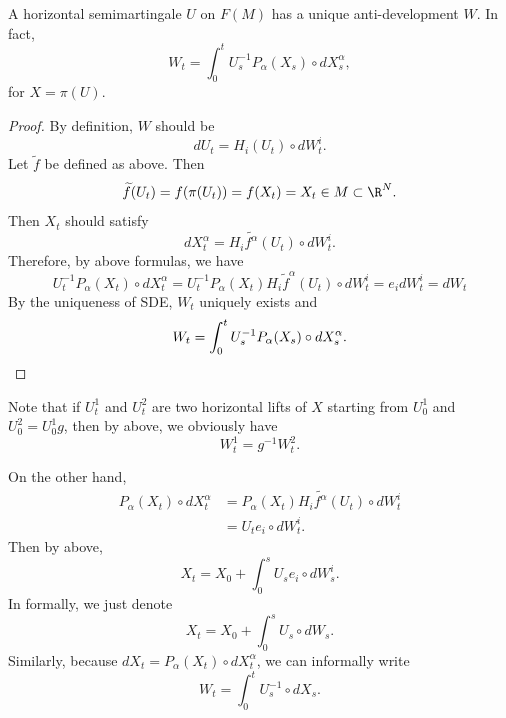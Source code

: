 \begin{thm}
    A horizontal semimartingale $U$ on $F(M)$ has a unique anti-development $W$. In fact,
    \begin{equation*}
        W_t = \int_0^t U_s^{-1}P_\alpha(X_s) \circ dX^\alpha_s,
    \end{equation*}
    for $X = \pi(U)$.
\end{thm}
\begin{proof}
    By definition, $W$ should be
    \begin{equation*}
        dU_t = H_i(U_t) \circ dW^i_t.
    \end{equation*}
    Let $\widetilde{f}$ be defined as above. Then
    \begin{equation*}
        \widetilde{f}(U_t) = f(\pi(U_t)) = f(X_t) = X_t \in M \subset \R^N.
    \end{equation*}
    Then $X_t$ should satisfy
    \begin{equation*}
        dX^\alpha_t = H_i \widetilde{f^\alpha}(U_t) \circ dW^i_t.
    \end{equation*}
    Therefore, by above formulas, we have
    \begin{equation*}
        U_t^{-1} P_\alpha\left(X_t\right) \circ d X_t^\alpha=U_t^{-1} P_\alpha\left(X_t\right) H_i \widetilde{f}^\alpha\left(U_t\right) \circ d W_t^i=e_i d W_t^i =dW_t
    \end{equation*}
    By the uniqueness of SDE, $W_t$ uniquely exists and
    \begin{equation*}
        W_t = \int_0^t U_s^{-1}P_\alpha(X_s) \circ dX^\alpha_s. \qedhere
    \end{equation*}
\end{proof}
\begin{rmk}
    Note that if $U^1_t$ and $U^2_t$ are two horizontal lifts of $X$ starting from $U_0^1$ and $U_0^2 = U_0^1g$, then by above, we obviously have
    \begin{equation*}
        W^1_t = g^{-1}W_t^2.
    \end{equation*}
\end{rmk}
\begin{rmk}
    On the other hand,
    \begin{align*}
        P_\alpha\left(X_t\right) \circ dX^\alpha_t &= P_\alpha\left(X_t\right)H_i \widetilde{f^\alpha}(U_t) \circ dW^i_t \\
        &= U_te_i \circ dW_t^i .
    \end{align*}
    Then by above,
    \begin{equation*}
        X_t = X_0 + \int_0^s U_se_i \circ dW^i_s.
    \end{equation*}
    In formally, we just denote
    \begin{equation*}
        X_t = X_0 + \int_0^s U_s \circ dW_s.
    \end{equation*}
    Similarly, because $dX_t = P_\alpha(X_t) \circ dX^\alpha_t$, we can informally write
    \begin{equation*}
        W_t = \int_0^t U_s^{-1} \circ dX_s.
    \end{equation*}
    
\end{rmk}

